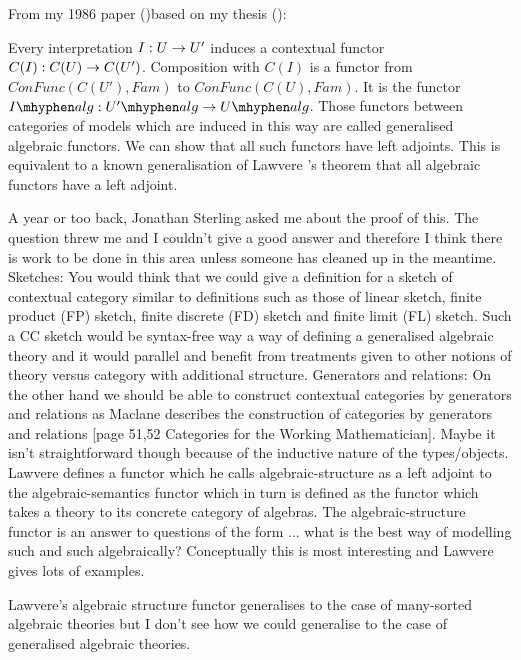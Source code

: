 \note From my 1986 paper (\cite{Cartmell86})based on my thesis (\cite{Cartmell78}):
\begin{tightquote}
Every interpretation $I:U \rightarrow U'$ induces a contextual functor 
$C(I):C(U) \rightarrow C(U')$. Composition with $C(I)$ is a functor from 
$ConFunc(C(U'),Fam)$ to
$ConFunc(C(U),Fam)$. It is the functor $\Ialg:\Upalg \morph \Ualg$. Those functors
between categories of models which are induced in this way are called generalised
algebraic functors. We can show that all such functors have left adjoints.
This is
equivalent to a known generalisation of Lawvere \cite{LawvereAlgebraicTheories}'s theorem that all algebraic
functors have a left adjoint. 
\end{tightquote}
A year or too back, Jonathan Sterling asked me about the proof of this. The question threw me and I couldn't give a good answer and therefore I think there is work to be done in this area unless someone has cleaned up in the meantime.
\note
Sketches: You would think that we could give a definition for a sketch of contextual category 
similar to  definitions such as those of linear sketch, finite product (FP) sketch, finite discrete (FD) sketch and finite limit (FL) sketch. Such a CC sketch would be syntax-free way a way of defining a generalised algebraic theory and it would parallel and benefit from treatments given to other notions of theory versus category with additional structure. 
\note
Generators and relations: On the other hand we should be able to construct contextual categories by generators and  
relations as Maclane describes the construction of categories by generators and relations
[page 51,52 Categories for the Working Mathematician]. Maybe it isn't  straightforward  though because of the inductive nature of the types/objects. 
\note
Lawvere defines a functor which he calls algebraic-structure as a  left adjoint  to the algebraic-semantics functor which in turn is defined as the functor which takes a theory to its concrete category of algebras. 
The algebraic-structure functor is an answer to questions of the form ... what is the best way of modelling such and such algebraically? 
Conceptually this is most interesting and Lawvere gives lots of examples. 

Lawvere's algebraic structure functor generalises to the case of many-sorted algebraic theories but I don't see how we could generalise to the case of generalised algebraic theories. 




